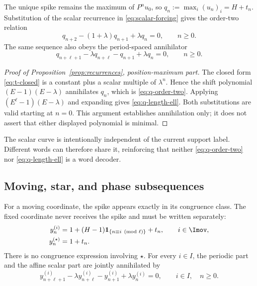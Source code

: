 \documentclass[11pt,letterpaper]{article}
\theoremstyle{definition}
\theoremstyle{remark}
\numberwithin{equation}{section}
\begin{document}
The unique spike remains the maximum of \(P^nu_0\), so
\(q_n:=\max_i(u_n)_i=H+t_n\).  Substitution of the scalar recurrence in
\eqref{eq:scalar-forcing} gives the order-two relation
\begin{equation}
 q_{n+2}-(1+\lambda)q_{n+1}+\lambda q_n=0,
 \qquad n\geq0.
 \label{eq:q-order-two}
\end{equation}
The same sequence also obeys the period-spaced annihilator
\begin{equation}
 q_{n+\ell+1}-\lambda q_{n+\ell}-q_{n+1}+\lambda q_n=0,
 \qquad n\geq0.
 \label{eq:q-length-ell}
\end{equation}

\begin{proof}[Proof of Proposition~\ref{prop:recurrences}, position-maximum part]
The closed form \eqref{eq:t-closed} is a constant plus a scalar multiple of
\(\lambda^n\).  Hence the shift polynomial
\((E-1)(E-\lambda)\) annihilates \(q_n\), which is
\eqref{eq:q-order-two}.  Applying \((E^\ell-1)(E-\lambda)\) and expanding
gives \eqref{eq:q-length-ell}.  Both substitutions are valid starting at
\(n=0\).  This argument establishes annihilation only; it does not assert
that either displayed polynomial is minimal.
\end{proof}

The scalar curve is intentionally independent of the current support label.
Different words can therefore share it, reinforcing that neither
\eqref{eq:q-order-two} nor \eqref{eq:q-length-ell} is a word decoder.

\subsection{Moving, star, and phase subsequences}

For a moving coordinate, the spike appears exactly in its congruence class.
The fixed coordinate never receives the spike and must be written
separately:
\begin{align}
 y_n^{(i)}&=1+(H-1)\mathbf1_{\{n\equiv i\pmod\ell\}}+t_n,
 \qquad i\in\Imov,
 \label{eq:moving-coordinate}\\
 y_n^{(\star)}&=1+t_n.
 \label{eq:star-coordinate}
\end{align}
There is no congruence expression involving \(\star\).  For every
\(i\in I\), the periodic part and the affine scalar part are jointly
annihilated by
\begin{equation}
 y_{n+\ell+1}^{(i)}-\lambda y_{n+\ell}^{(i)}
 -y_{n+1}^{(i)}+\lambda y_n^{(i)}=0,
 \qquad i\in I,\quad n\geq0.
 \label{eq:y-annihilator}
\end{equation}
\end{document}
